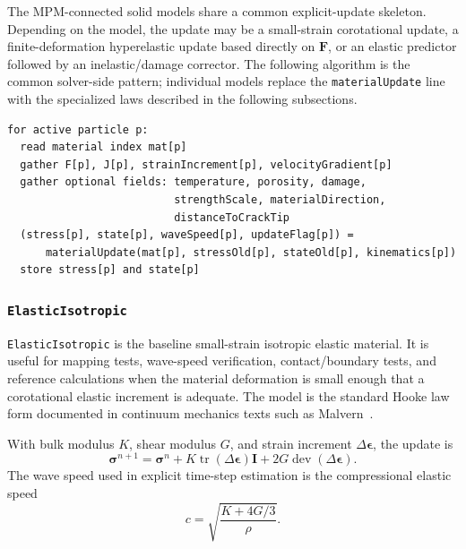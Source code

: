 The MPM-connected solid models share a common explicit-update skeleton.  Depending on the model, the update may be a small-strain corotational update, a finite-deformation hyperelastic update based directly on \(\mathbf{F}\), or an elastic predictor followed by an inelastic/damage corrector.  The following algorithm is the common solver-side pattern; individual models replace the \texttt{materialUpdate} line with the specialized laws described in the following subsections.

\begin{lstlisting}[caption={Common explicit MPM continuum material update pattern.},label={alg:continuum-material-dispatch},basicstyle=\ttfamily\small]
for active particle p:
  read material index mat[p]
  gather F[p], J[p], strainIncrement[p], velocityGradient[p]
  gather optional fields: temperature, porosity, damage,
                          strengthScale, materialDirection,
                          distanceToCrackTip
  (stress[p], state[p], waveSpeed[p], updateFlag[p]) =
      materialUpdate(mat[p], stressOld[p], stateOld[p], kinematics[p])
  store stress[p] and state[p]
\end{lstlisting}

\subsubsection{\texttt{ElasticIsotropic}}
\label{subsubsec:elastic-isotropic-model}

\texttt{ElasticIsotropic} is the baseline small-strain isotropic elastic material.  It is useful for mapping tests, wave-speed verification, contact/boundary tests, and reference calculations when the material deformation is small enough that a corotational elastic increment is adequate.  The model is the standard Hooke law form documented in continuum mechanics texts such as Malvern~\cite{malvern1969}.

With bulk modulus \(K\), shear modulus \(G\), and strain increment \(\Delta\boldsymbol{\epsilon}\), the update is
\begin{equation}
  \boldsymbol{\sigma}^{n+1}
  = \boldsymbol{\sigma}^{n}
  + K\operatorname{tr}(\Delta\boldsymbol{\epsilon})\mathbf{I}
  + 2G\operatorname{dev}(\Delta\boldsymbol{\epsilon}).
  \label{eq:elastic-isotropic-update}
\end{equation}
The wave speed used in explicit time-step estimation is the compressional elastic speed
\begin{equation}
  c = \sqrt{\frac{K+4G/3}{\rho}} .
  \label{eq:elastic-isotropic-wavespeed}
\end{equation}

